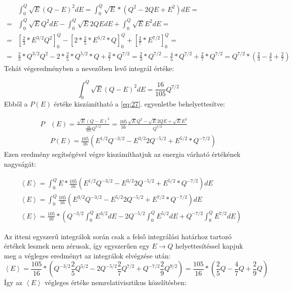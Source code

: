 \begin{align} \label{eq:70}
&\int_{0}^{Q} \sqrt{E} \left( Q - E \right)^{2} dE
=
\int_{0}^{Q} \sqrt{E} * \left( Q^{2} - 2QE + E^{2} \right) dE
= \nonumber \\
=&
\int_{0}^{Q} \sqrt{E} Q^{2} dE
-
\int_{0}^{Q} \sqrt{E} 2QE dE
+
\int_{0}^{Q} \sqrt{E} E^{2} dE
= \nonumber \\
=&
\left[ \frac{2}{3} * E^{3/2} Q^{2} \right]_{0}^{Q}
-
\left[ 2 * \frac{2}{5} * E^{5/2} * Q \right]_{0}^{Q}
+
\left[ \frac{2}{7} * E^{7/2} \right]_{0}^{Q}
= \nonumber \\
=&
\frac{2}{3} * Q^{3/2} Q^{2} - 2 * \frac{2}{5} * Q^{5/2} * Q + \frac{2}{7} * Q^{7/2}
=
\frac{2}{3} * Q^{7/2} - \frac{4}{5} * Q^{7/2} + \frac{2}{7} * Q^{7/2}
=
Q^{7/2} * \left( \frac{2}{3} - \frac{4}{5} + \frac{2}{7} \right)
\end{align}
Tehát végeredményben a nevezőben levő integrál értéke:

\begin{equation} \label{eq:71}
\int_{0}^{Q} \sqrt{E} \left( Q - E \right)^{2} dE
=
\frac{16}{105} Q^{7/2}
\end{equation}
Ebből a $P \left( E \right)$ értéke kiszámítható a \ref{eq:27}. egyenletbe behelyettesítve:

\begin{align} \label{eq:72}
P& \left( E \right)
=
\frac{\sqrt{E} \left( Q - E \right)^{2}}{\frac{16}{105} Q^{7/2}}
=
\frac{105}{16} \frac{\sqrt{E} Q^{2} - \sqrt{E} 2QE + \sqrt{E} E^{2}}{Q^{7/2}}
\nonumber \\
&P \left( E \right)
=
\frac{105}{16} \left( E^{1/2} Q^{-3/2} - E^{3/2} 2 Q^{-5/2} + E^{5/2} * Q^{-7/2} \right)
\end{align}
Ezen eredmény segítségével végre kiszámíthatjuk az energia várható értékének nagyságát:

\begin{align} \label{eq:73}
&\left< E \right>
=
\int_{0}^{Q} E * \frac{105}{16} \left( E^{1/2} Q^{-3/2} - E^{3/2} 2 Q^{-5/2} + E^{5/2} * Q^{-7/2} \right) dE
\nonumber \\
&\left< E \right>
=
\int_{0}^{Q} \frac{105}{16} \left( E^{3/2} Q^{-3/2} - E^{5/2} 2 Q^{-5/2} + E^{7/2} * Q^{-7/2} \right) dE
\nonumber \\
&\left< E \right>
=
\frac{105}{16}
*
\left(
Q^{-3/2} \int_{0}^{Q} E^{3/2} dE
-
2 Q^{-5/2} \int_{0}^{Q} E^{5/2} dE
+
Q^{-7/2} \int_{0}^{Q} E^{7/2} dE
\right)
\end{align}

Az itteni egyszerű integrálok során csak a felső integrálási határhoz tartozó értékek lesznek nem zérusak, így egyszerűen egy $E \to Q$ helyettesítéssel kapjuk meg a végleges eredményt az integrálok elvégzése után:
\begin{equation} \label{eq:74}
\left< E \right>
=
\frac{105}{16}
*
\left(
Q^{-3/2} \frac{2}{5} Q^{5/2} - 2Q^{-5/2} \frac{2}{7} Q^{7/2} + Q^{-7/2} \frac{2}{9} Q^{9/2}
\right)
=
\frac{105}{16}
*
\left(
\frac{2}{5} Q - \frac{4}{7} Q + \frac{2}{9} Q
\right)
\end{equation}
Így az $\left< E \right>$ végleges értéke nemrelativisztikus közelítésben:

